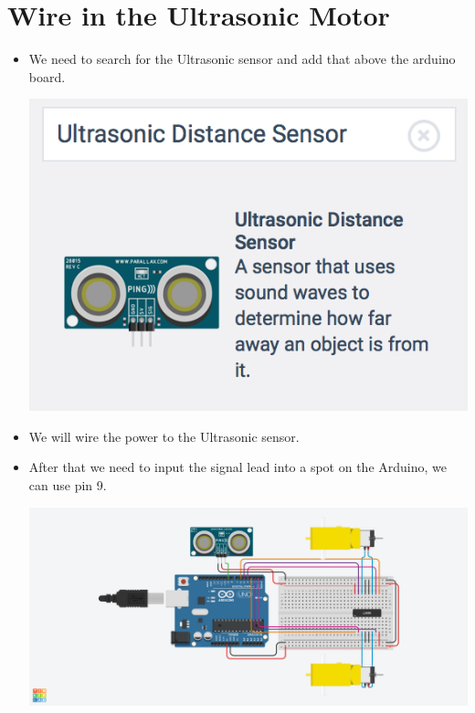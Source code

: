 \documentclass[12pt]{article}
\begin{document}
\begin{itemize}
\begin{center}
		\end{center}
	\end{itemize}
	
	
	
	
	
	
	
	
	
	
	
	
\section *{Wire in the Ultrasonic Motor}
	\begin{itemize}
		\item We need to search for the Ultrasonic sensor and add that above the arduino board.
		\begin{center}
			\includegraphics[scale = 0.7]{./Images/ultrasonic}
		\end{center}
		\item We will wire the power to the Ultrasonic sensor.  
		\newpage
		\item After that we need to input the signal lead into a spot on the Arduino, we can use pin 9.
		\begin{center}
			\includegraphics[scale = 0.3]{./Images/circuit6}
		\end{center}
	\end{itemize}
	
\end{document}
